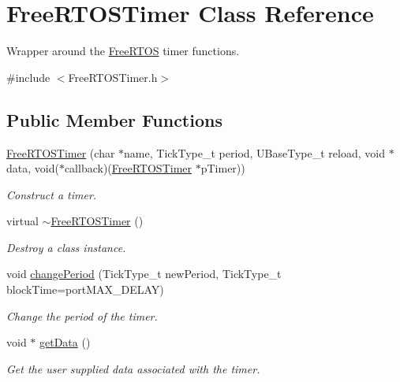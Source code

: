 \hypertarget{class_free_r_t_o_s_timer}{}\section{Free\+R\+T\+O\+S\+Timer Class Reference}
\label{class_free_r_t_o_s_timer}


Wrapper around the \hyperlink{class_free_r_t_o_s}{Free\+R\+T\+OS} timer functions.  




{\ttfamily \#include $<$Free\+R\+T\+O\+S\+Timer.\+h$>$}

\subsection*{Public Member Functions}
\begin{DoxyCompactItemize}
\item 
\hyperlink{class_free_r_t_o_s_timer_a71b533a7326cf6f9b095ef6d2277bb1d}{Free\+R\+T\+O\+S\+Timer} (char $\ast$name, Tick\+Type\+\_\+t period, U\+Base\+Type\+\_\+t reload, void $\ast$data, void($\ast$callback)(\hyperlink{class_free_r_t_o_s_timer}{Free\+R\+T\+O\+S\+Timer} $\ast$p\+Timer))
\begin{DoxyCompactList}\small\item\em Construct a timer. \end{DoxyCompactList}\item 
virtual \hyperlink{class_free_r_t_o_s_timer_aa8a047ff6418d0d0d62716f47fd863c5}{$\sim$\+Free\+R\+T\+O\+S\+Timer} ()
\begin{DoxyCompactList}\small\item\em Destroy a class instance. \end{DoxyCompactList}\item 
void \hyperlink{class_free_r_t_o_s_timer_a2032df1fe519879731656090709abfad}{change\+Period} (Tick\+Type\+\_\+t new\+Period, Tick\+Type\+\_\+t block\+Time=port\+M\+A\+X\+\_\+\+D\+E\+L\+AY)
\begin{DoxyCompactList}\small\item\em Change the period of the timer. \end{DoxyCompactList}\item 
void $\ast$ \hyperlink{class_free_r_t_o_s_timer_a162a7a248cef2303e6b96048056ef322}{get\+Data} ()
\begin{DoxyCompactList}\small\item\em Get the user supplied data associated with the timer. \end{DoxyCompactList}\item 

\end{DoxyCompactItemize}
